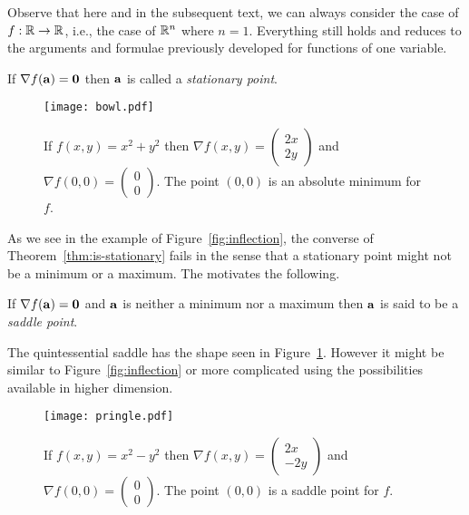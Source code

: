 Observe that here and in the subsequent text, we can always consider the case of \(f:\bR \to \bR\), i.e., the case of \(\bR^n\) where \(n=1\).
Everything still holds and reduces to the arguments and formulae previously developed for functions of one variable.


\begin{definition}
    If \(\nabla f(\aa)=\mathbf{0}\) then \(\aa\) is called a \emph{stationary point}.
\end{definition}


\begin{figure}[htbp]
    \begin{center}
        \texttt{[image: bowl.pdf]}
        \caption{If \(f(x,y)=x^2+y^2\) then \(\nabla f(x,y) = \left(\begin{smallmatrix}
                2x\\2y
            \end{smallmatrix}\right)\) and \(\nabla f(0,0) =\left(\begin{smallmatrix}
                0\\0
            \end{smallmatrix}\right) \). The point \((0,0)\) is an absolute minimum for \(f\).}
    \end{center}
\end{figure}

As we see in the example of Figure~\ref{fig:inflection}, the converse of Theorem~\ref{thm:is-stationary} fails in the sense that a stationary point might not be a minimum or a maximum.
The motivates the following.

\begin{definition}
    If \(\nabla f(\aa)=\mathbf{0}\) and \(\aa\) is neither a minimum nor a maximum then \(\aa\) is said to be a \emph{saddle point}.
\end{definition}

The quintessential saddle has the shape seen in Figure~\ref{fig:pringle}.
However it might be similar to Figure~\ref{fig:inflection} or more complicated using the possibilities available in higher dimension.

\begin{figure}[htbp]
    \centering
    \texttt{[image: pringle.pdf]}
    \caption{If \(f(x,y)=x^2-y^2\) then \(\nabla f(x,y) = \left(\begin{smallmatrix}
            2x\\-2y
        \end{smallmatrix}\right)\) and \(\nabla f(0,0) =\left(\begin{smallmatrix}
            0\\0
        \end{smallmatrix}\right) \). The point \((0,0)\) is a saddle point for \(f\).}%
    \label{fig:pringle}
\end{figure}


